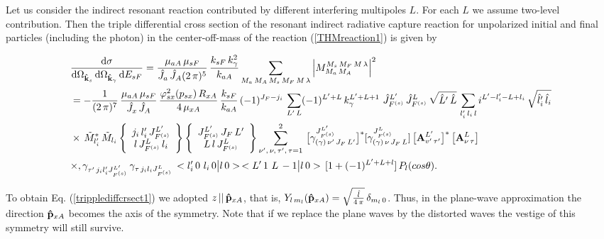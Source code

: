 \documentclass[prl,unsortedaddress,groupedaddress,twocolumn,amsmath,amsfonts,amssymb,showpacs,floatfix,nofootinbib]{revtex4}
\begin{document}
Let us consider the indirect resonant reaction contributed by different interfering multipoles $L$. For each $L$ we assume two-level contribution.
Then the triple differential cross section of the resonant indirect radiative capture reaction for unpolarized initial and final particles (including the photon) in the center-off-mass of the reaction (\ref{THMreaction1}) is  given by
\begin{widetext}
\begin{align}
&\frac{ {\rm d}\sigma}{  {\rm d}{\Omega}_{  {\rm{\bf {\hat k}}}_{s} }\,{\rm d}{\Omega}_{{\rm {\bf {\hat k}}}_{\gamma}}\, {\rm d}{E_{sF}} }=
 \frac{\mu_{aA}\,\mu_{sF}}{{\hat J}_{a}\,{\hat J}_{A}(2\,\pi)^{5}}\,\frac{k_{sF}\,k_{\gamma}^{2}}{k_{aA}}
\sum\limits_{M_{a}\,M_{A}\,M_{s}\,M_{F}\,M\,\lambda}\Big|M_{M_{a}\,M_{A}}^{M_{s}\,M_{F}\,M\,\lambda}\Big|^{2}
 \nonumber\\
&= - \frac{1}{(2\,\pi)^{7} }\,\frac{\mu_{aA}\,\mu_{sF}}{{\hat J}_{x}\,{\hat J}_{A}} \,\frac{\varphi_{sx}^{2}(p_{sx})\,R_{xA}}{4\,\mu_{xA}}\,\frac{ k_{sF}}{k_{aA}}\,(-1)^{J_{F}  - j_{i} }\,
  \sum\limits_{L'\,L} (-1)^{L'+L}\, k_{\gamma}^{L'+L+1}\,\,{\hat J}_{F^{(s)}}^{L'}\,{\hat J}_{F^{(s)}}^{L}\,\sqrt{ {\hat L}'\,{\hat L}}\,  
\sum\limits_{l_{i}'\,l_{i}\,l}i^{L'-l_{i}'- L+l_{i}}\,\sqrt{ {\hat l}_{i}'\,{\hat l}_{i} }      \nonumber\\
& \times\,  {\tilde M}_{l_{i}'}^{*}\,{\tilde M}_{l_{i}}\, \Bigg\lbrace \begin{array}{ccc} j_{i}\,l_{i}'\, J_{F^{(s)}}^{L'} \\  l\,J_{F^{(s)}}^{L}\,l_{i} \end{array} \Bigg\rbrace\,\Bigg\lbrace \begin{array}{ccc} J_{F^{(s)}}^{L'}\, J_{F}\,L' \\
L\,l\,J_{F^{(s)}}^{L} \end{array} \Bigg\rbrace   \sum\limits_{\nu', \,\nu,\,\tau',\, \tau=1}^{2}\,\big[\gamma_{ (\gamma)\,\nu'\,J_{F}\,L'}^{J_{F^{(s)}}^{L'}}  \big]^{*} [\gamma_{(\gamma)\,\nu\,J_{F}\,L}^{J_{F^{(s)}}^{L}} ]\,\big[{\bf A}_{v'\,\tau'}^{L'} \big]^{*}\,\big[{\bf A}_{\nu\,\tau}^{L} \big]\     \nonumber\\
& \times ,\gamma_{\tau'\,j_{i}l_{i}'J_{F^{(s)}}^{L'} }\,\gamma_{\tau\,j_{i}l_{i}J_{F^{(s)}}^{L}} \, <l_{i}'\,0\,\,l_{i}\,0\big|l\,0>\,<L'\,1\,\,L\,-1 \big| l\,0>\,[1+ (-1)^{L'+L+l}]\,P_{l}(cos{\theta}).
\label{tripplediffcrsect1}
\end{align}
\end{widetext}
To obtain Eq. (\ref{tripplediffcrsect1}) we adopted $z\, ||\, {\rm {\bf {\hat  p}}}_{xA} $,  that is,  
$Y_{l\,m_{l}}({\rm {\bf {\hat  p}}}_{xA}) = \sqrt{\frac{{\hat l}}{4\,\pi}}\,\delta_{m_{l}\,0}$.
Thus, in the plane-wave approximation the direction ${\rm {\bf {\hat  p}}}_{xA}$ becomes the axis of the symmetry.
Note that if we replace the plane waves by the distorted waves the vestige of this symmetry will still survive.
\end{document}
